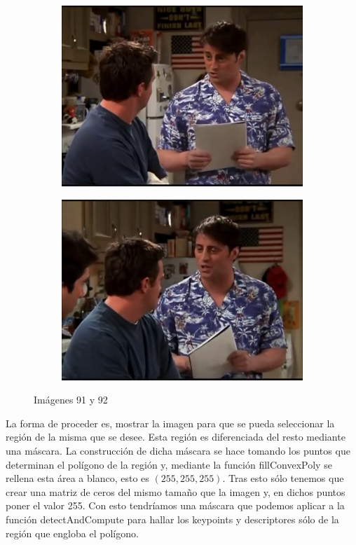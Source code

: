 \documentclass[12pt,a4paper]{article}
\begin{document}
\begin{figure}[H]
  \centering
    \begin{subfigure}{0.45\textwidth}
      \includegraphics[scale=0.33]{./Imagenes/91.png}
    \end{subfigure}
    \begin{subfigure}{0.45\textwidth}
      \includegraphics[scale=0.33]{./Imagenes/92.png}
    \end{subfigure}
    \caption{Imágenes 91 y 92}
\end{figure}

La forma de proceder es, mostrar la imagen para que se pueda seleccionar la región de la misma que se desee. Esta región es diferenciada del resto mediante una máscara. La construcción de dicha máscara se hace tomando los puntos que determinan el polígono de la región y, mediante la función fillConvexPoly se rellena esta área a blanco, esto es $(255,255,255)$. Tras esto sólo tenemos que crear una matriz de ceros del mismo tamaño que la imagen y, en dichos puntos poner el valor 255. Con esto tendríamos una máscara que podemos aplicar a la función detectAndCompute para hallar los keypoints y descriptores sólo de la región que engloba el polígono.
\end{document}
